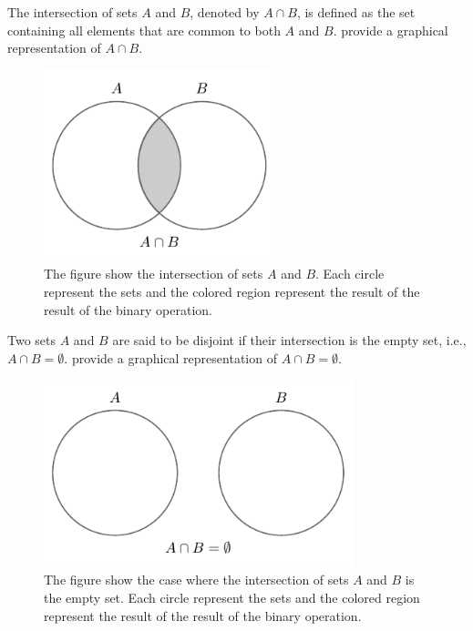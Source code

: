 \begin{definition}[Intersection]
	The intersection of sets $A$ and $B$, denoted by $A \cap B$, is defined as the set containing all elements that are common to both $A$ and $B$.  provide a graphical representation of $A \cap B$.
	\begin{figure}[H]
		\centering
		\includegraphics[width = 0.6\textwidth]{figures/set_intersection.pdf}
		\caption{The figure show the intersection of sets $A$ and $B$. Each circle represent the sets and the colored region represent the result of the result of the binary operation.}
		\label{fig:set_intersection}
	\end{figure}
\end{definition}

\begin{definition}[Disjoint]
	Two sets $A$ and $B$ are said to be disjoint if their intersection is the empty set, i.e., $A \cap B = \emptyset$.  provide a graphical representation of $A \cap B=\emptyset$.
	\begin{figure}[H]
		\centering
		\includegraphics[width = 0.8\textwidth]{figures/set_disjoint.pdf}
		\caption{The figure show the case where the intersection of sets $A$ and $B$ is the empty set. Each circle represent the sets and the colored region represent the result of the result of the binary operation.}
		\label{fig:set_disjoint}
	\end{figure}
\end{definition}


